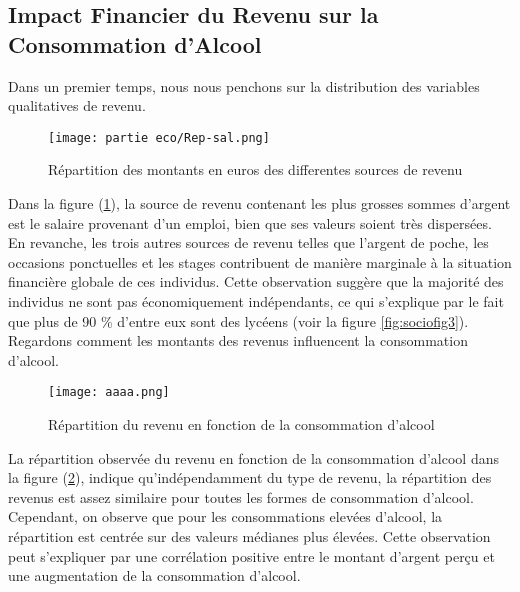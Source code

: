 \documentclass{article}
\begin{document}
\subsection{Impact Financier du Revenu sur la Consommation d'Alcool}
Dans un premier temps, nous nous penchons sur la distribution des variables qualitatives de revenu.

\begin{figure}[H]
  \centering
  \texttt{[image: partie eco/Rep-sal.png]} 
  \caption{Répartition des montants en euros des differentes sources de revenu}
  \label{fig:ecofig4}
\end{figure}

Dans la figure (\ref{fig:ecofig4}), la source de revenu contenant les plus grosses sommes d'argent est le salaire provenant d'un emploi, bien que ses valeurs soient très dispersées. En revanche, les trois autres sources de revenu telles que l'argent de poche, les occasions ponctuelles et les stages contribuent de manière marginale à la situation financière globale de ces individus. Cette observation suggère que la majorité des individus ne sont pas économiquement indépendants, ce qui s'explique par le fait que plus de 90 \% d'entre eux sont des lycéens (voir la figure \ref{fig:sociofig3}). Regardons comment les montants des revenus influencent la consommation d'alcool.

\begin{figure}[H]
  \centering
  \texttt{[image: aaaa.png]} 
  \caption{Répartition du revenu en fonction de la consommation d'alcool}
  \label{fig:ecofig6}
\end{figure}
La répartition observée du revenu en fonction de la consommation d'alcool dans la figure (\ref{fig:ecofig6}), indique qu'indépendamment du type de revenu, la répartition des revenus est assez similaire pour toutes les formes de consommation d'alcool. Cependant, on observe que pour les consommations elevées d'alcool, la répartition est centrée sur des valeurs médianes plus  élevées. Cette observation peut s'expliquer par une corrélation positive entre le montant d'argent perçu et une augmentation de la consommation d'alcool.
\end{document}
